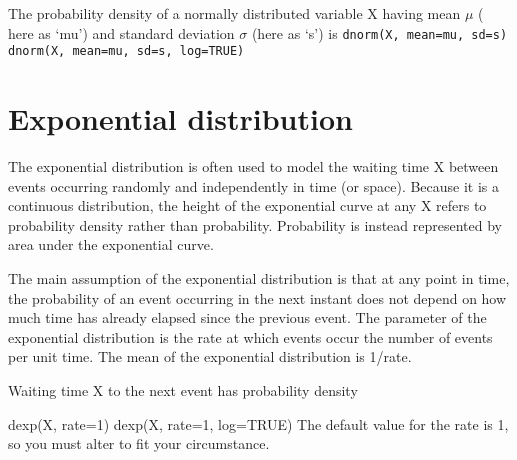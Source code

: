 \documentclass[12pt, a4paper]{article}
\theoremstyle{plain}
\theoremstyle{definition}
\theoremstyle{remark}
\begin{document}
The probability density of a normally distributed variable X having mean $\mu$ ( here as `mu') and standard deviation $\sigma$ (here as `s')  is
\texttt{dnorm(X, mean=mu, sd=s)}
\texttt{dnorm(X, mean=mu, sd=s, log=TRUE)}
\newpage
\section{Exponential distribution}
The exponential distribution is often used to model the waiting time X between events occurring randomly and independently in time (or space). Because it is a continuous distribution, the height of the exponential curve at any X refers to probability density rather than probability. Probability is instead represented by area under the exponential curve.

The main assumption of the exponential distribution is that at any point in time, the probability of an event occurring in the next instant does not depend on how much time has already elapsed since the previous event. The parameter of the exponential distribution is the rate at which events occur  the number of events per unit time. The mean of the exponential distribution is 1/rate.

Waiting time X to the next event has probability density

dexp(X, rate=1)
dexp(X, rate=1, log=TRUE)
The default value for the rate is 1, so you must alter to fit your circumstance.
\end{document}

